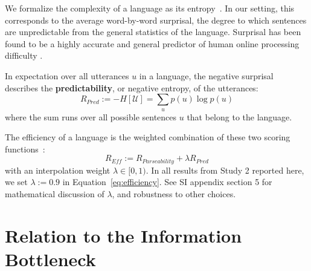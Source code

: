 \documentclass[10pt,twoside,lineno]{article}
\newcommand{\key}[1]{\textbf{#1}}
\begin{document}
We formalize the complexity of a language as its entropy~\cite{ferreri2003least,ferrericancho2007global,futrell2017memory}.
In our setting, this corresponds to the average word-by-word surprisal, the degree to which sentences are unpredictable from the general statistics of the language.
Surprisal has been found to be a highly accurate and general predictor of human online processing difficulty \cite{hale2001probabilistic,levy2008expectation,smith2013effect}.

In expectation over all utterances $u$ in a language, the negative surprisal describes the \key{predictability}, or negative entropy, of the utterances:
\begin{equation}
	R_{Pred} := - H[\mathcal{U}] = \sum_{u} p(u) \log p(u)
\end{equation}
where the sum runs over all possible sentences $u$ that belong to the language.



The efficiency of a language is the weighted combination of these two scoring functions~\cite{ferreri2003least,frank2012predicting,zaslavsky2018efficient,kemp2012kinship,regier2015word,goodman2013knowledge}:
\begin{equation}\label{eq:efficiency}
	R_{\textit{Eff}} := R_{\textit{Parseability}} + \lambda R_\textit{Pred}
\end{equation}
with an interpolation weight $\lambda \in [0,1)$.
In all results from Study 2 reported here, we set $\lambda := 0.9$ in Equation~\ref{eq:efficiency}.
See SI appendix section 5 for mathematical discussion of $\lambda$, and robustness to other choices.



\section{Relation to the Information Bottleneck}
\end{document}
